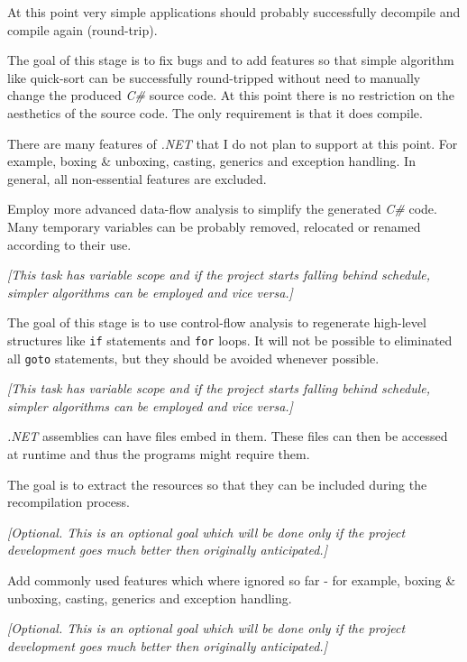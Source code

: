 \begin{enumerate}
At this point very simple applications should probably successfully 
decompile and compile again (round-trip).

The goal of this stage is to fix bugs and to add features so that simple 
algorithm like quick-sort can be successfully round-tripped without need to 
manually change the produced \emph{C\#} source code.  At this point there is 
no restriction on the aesthetics of the source code.  The only requirement 
is that it does compile. 

There are many features of \emph{.NET} that I do not plan to support at 
this point.  For example, boxing \& unboxing, casting, generics and 
exception handling.  In general, all non-essential features are excluded.

Employ more advanced data-flow analysis to simplify the generated \emph{C\#} 
code.  Many temporary variables can be probably removed, relocated or 
renamed according to their use.

\emph{[This task has variable scope and if the project starts falling behind 
schedule, simpler algorithms can be employed and vice versa.]}

The goal of this stage is to use control-flow analysis to regenerate 
high-level structures like \verb|if| statements and \verb|for| loops. 
It will not be possible to eliminated all \verb|goto| statements, but they 
should be avoided whenever possible.

\emph{[This task has variable scope and if the project starts falling behind 
schedule, simpler algorithms can be employed and vice versa.]}

\emph{.NET} assemblies can have files embed in them.  These files can then 
be accessed at runtime and thus the programs might require them.

The goal is to extract the resources so that they can be included during 
the recompilation process.

\emph{[Optional.  This is an optional goal which will be done only if the 
project development goes much better then originally anticipated.]}

Add commonly used features which where ignored so far - for example, 
boxing \& unboxing, casting, generics and exception handling.

\emph{[Optional.  This is an optional goal which will be done only if the 
project development goes much better then originally anticipated.]}


\end{enumerate}

